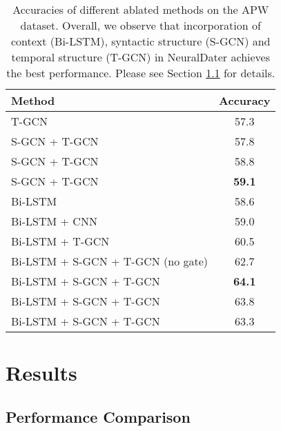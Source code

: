 \documentclass[11pt,a4paper]{article}
\newcommand{\refsec}[1]{Section \ref{#1}}
\newcommand{\method}{NeuralDater}
\begin{document}
\begin{table}[!t]
	\begin{small}
		\centering
		\begin{tabular}{lc}
			\toprule
			Method 			 & Accuracy \\
			\midrule		
			\addlinespace
T-GCN 								& 57.3 \\
			S-GCN + T-GCN 				& 57.8 \\
			S-GCN + T-GCN 				& 58.8 \\
			S-GCN + T-GCN 				& \textbf{59.1} \\
			\midrule
			Bi-LSTM 							& 58.6 \\
			Bi-LSTM + CNN 						& 59.0 \\
			Bi-LSTM + T-GCN						& 60.5 \\
			Bi-LSTM + S-GCN + T-GCN (no gate)	& 62.7 \\
			Bi-LSTM + S-GCN + T-GCN 		& \textbf{64.1} \\
			Bi-LSTM + S-GCN + T-GCN 		& 63.8 \\
			Bi-LSTM + S-GCN + T-GCN 		& 63.3 \\
			\bottomrule
		\end{tabular}
	\caption{\label{tb:result_ablation}Accuracies of different ablated methods on the APW dataset. Overall, we observe that incorporation of context (Bi-LSTM), syntactic structure (S-GCN) and temporal structure (T-GCN) in \method{} achieves the best performance. Please see \refsec{sec:perf_comp} for details.}
\end{small}
\end{table}


\section{Results}
\label{sec:results}

\subsection{Performance Comparison}
\label{sec:perf_comp}
\end{document}
